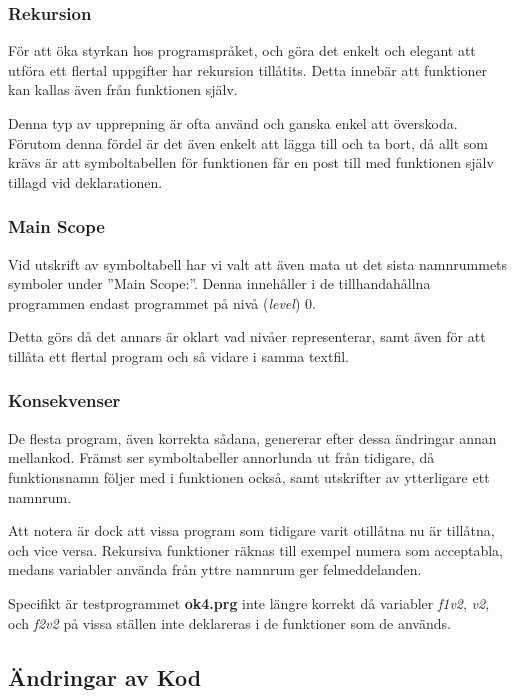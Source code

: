 		\subsubsection{Rekursion}
		
			För att öka styrkan hos programspråket, och göra det enkelt och elegant att utföra ett flertal uppgifter har rekursion tillåtits. Detta innebär att funktioner kan kallas även från funktionen själv.
			
			Denna typ av upprepning är ofta använd och ganska enkel att överskoda. Förutom denna fördel är det även enkelt att lägga till och ta bort, då allt som krävs är att symboltabellen för funktionen får en post till med funktionen själv tillagd vid deklarationen.
			
		
		\subsubsection{Main Scope}
		
			Vid utskrift av symboltabell har vi valt att även mata ut det sista namnrummets symboler under ''Main Scope:''. Denna innehåller i de tillhandahållna programmen endast programmet på nivå (\textit{level}) 0.
			
			Detta görs då det annars är oklart vad nivåer representerar, samt även för att tillåta ett flertal program och så vidare i samma textfil.

		\subsubsection{Konsekvenser}
			\label{Sec:cha}
			
			De flesta program, även korrekta sådana, genererar efter dessa ändringar annan mellankod. Främst ser symboltabeller annorlunda ut från tidigare, då funktionsnamn följer med i funktionen också, samt utskrifter av ytterligare ett namnrum.
			
			Att notera är dock att vissa program som tidigare varit otillåtna nu är tillåtna, och vice versa. Rekursiva funktioner räknas till exempel numera som acceptabla, medans variabler använda från yttre namnrum ger felmeddelanden.
			
			Specifikt är testprogrammet \textbf{ok4.prg} inte längre korrekt då variabler \textit{f1v2}, \textit{v2}, och \textit{f2v2} på vissa ställen inte deklareras i de funktioner som de används.
			

	\subsection{Ändringar av Kod}

